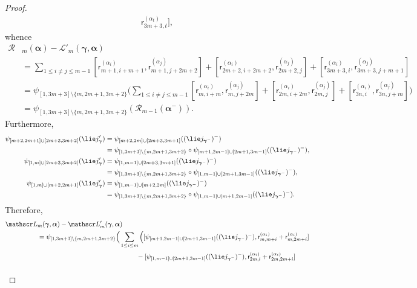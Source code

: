 \documentclass[12pt, reqno]{amsart}
\theoremstyle{definition}
\numberwithin{equation}{section}
\newcommand{\sr}[3]{\mathsf r_{#1,#2}^{(#3)}}
\begin{document}
\begin{proof}
\begin{align*}
\sr{3m+3}{t}{\alpha_t}],
\end{align*}
whence
\begin{align}
\mathscr R&_m(\boldsymbol\alpha)-\mathscr L'_m(\boldsymbol\gamma,\boldsymbol\alpha)\nonumber\\
&=\sum_{1\le i\not=j\le m-1} [\sr{m+1}{i+m+1}{\alpha_{i}},\sr{m+1}{j+2m+2}{\alpha_{j}}]+[\sr{2m+2}{i+2m+2}{\alpha_{i}},\sr{2m+2}{j}{\alpha_{j}}]+[\sr{3m+3}{i}{\alpha_{i}},
\sr{3m+3}{j+m+1}{\alpha_{j}}]\nonumber\\
&=\psi_{[1,3m+3]\setminus\{m,2m+1,3m+2\}}\Big(\sum_{1\le i\not=j\le m-1} [\sr{m}{i+m}{\alpha_{i}},\sr{m}{j+2m}{\alpha_{j}}]+[\sr{2m}{i+2m}{\alpha_{i}},\sr{2m}{j}{\alpha_{j}}]+[\sr{3n}{i}{\alpha_{i}},
\sr{3n}{j+m}{\alpha_{j}}]\Big)\nonumber\\
&=\psi_{[1,3m+3]\setminus\{m,2m+1,3m+2\}}(\mathscr R_{m-1}(\boldsymbol\alpha^-)).\label{eq:interm jc id}
\end{align}
Furthermore,
\begin{align*}
\psi_{[m+2,2m+1]\cup[2m+3,3m+2]}(\lie j'_{\boldsymbol\gamma})&=
\psi_{[m+2,2m]\cup[2m+3,3m+1]}((\lie j_{\boldsymbol\gamma^-})^-)\\
&=
\psi_{[1,3m+3]\setminus\{m,2m+1,3m+2\}}\circ \psi_{[m+1,2m-1]\cup [2m+1,3m-1]}((\lie j_{\boldsymbol\gamma^-})^-),\\
\psi_{[1,m]\cup[2m+3,3m+2]}(\lie j'_{\boldsymbol\gamma})&=\psi_{[1,m-1]\cup[2m+3,3m+1]}((\lie j_{\boldsymbol\gamma^-})^-)\\
&=\psi_{[1,3m+3]\setminus\{m,2m+1,3m+2\}}\circ \psi_{[1,m-1]\cup[2m+1,3m-1]}((\lie j_{\boldsymbol\gamma^-})^-),\\
\psi_{[1,m]\cup[m+2,2m+1]}(\lie j'_{\boldsymbol\gamma})&=\psi_{[1,m-1]\cup[m+2,2m]}((\lie j_{\boldsymbol\gamma^-})^-)\\
&=\psi_{[1,3m+3]\setminus\{m,2m+1,3m+2\}}\circ \psi_{[1,m-1]\cup[m+1,2m-1]}((\lie j_{\boldsymbol\gamma^-})^-).
\end{align*}
Therefore,
\begin{align*}
\mathscr L&_m(\boldsymbol\gamma,\boldsymbol{\alpha})-
\mathscr L'_m(\boldsymbol\gamma,\boldsymbol{\alpha})\\
&=
\psi_{[1,3m+3]\setminus\{m,2m+1,3m+2\}}\Big(\sum_{1\le i\le m}\Big(
[\psi_{[m+1,2m-1]\cup [2m+1,3m-1]}((\lie j_{\boldsymbol\gamma^-})^-),\sr m{m+i}{\alpha_i}+\sr{m}{2m+i}{\alpha_i}]\\
&
\phantom{=
\psi_{[1,3m+3]\setminus\{m,2m+1,3m+2\}}\Big(\sum_{1\le i\le m}}
-[\psi_{[1,m-1]\cup[2m+1,3m-1]}((\lie j_{\boldsymbol\gamma^-})^-),
\sr{2m}{i}{\alpha_{i}}+\sr{2m}{2m+i}{\alpha_{i}}]\\

\end{align*}
\end{proof}
\end{document}
